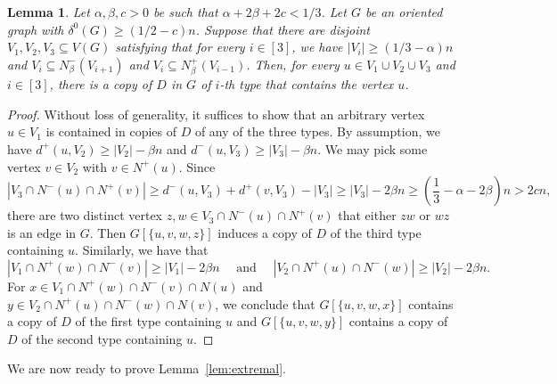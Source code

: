 \documentclass[11pt]{amsart}
\newtheorem{lemma}[theorem]{Lemma}
\begin{document}
\begin{lemma}\label{lem:ith}
    Let $\alpha, \beta, c>0$ be such that $\alpha+2\beta+2c < 1/3$. Let $G$ be an oriented graph with $\delta^0(G)\ge (1/2-c)n$. Suppose that there are disjoint $V_1,V_2,V_3\subseteq V(G)$ satisfying that for every $i\in [3]$, we have $|V_i|\ge (1/3-\alpha)n$ and $V_i\subseteq N^-_\beta(V_{i+1})$ and $V_i\subseteq N^+_\beta(V_{i-1})$. Then, for every $u\in V_1\cup V_2\cup V_3$ and $i \in [3]$, there is a copy of $D$ in $G$ of $i$-th type that contains the vertex $u$.
\end{lemma}

\begin{proof}
    Without loss of generality, it suffices to show that an arbitrary vertex $u\in V_1$ is contained in copies of $D$ of any of the three types.
    By assumption, we have $d^+(u,V_{2})\ge |V_{2}|-\beta n$ and $d^-(u,V_{3})\ge |V_{3}|-\beta n$.
    We may pick some vertex $v\in V_2$ with $v\in N^+(u)$.
    Since
    $$|V_3\cap N^-(u)\cap N^+(v)|\ge d^-(u, V_3)+d^+(v, V_3)-|V_3|\ge |V_3|-2\beta n \ge \left( \frac{1}{3}-\alpha - 2\beta \right) n >2cn,$$
    there are two distinct vertex $z,w\in V_3\cap N^-(u)\cap N^+(v)$ that either $zw$ or $wz$ is an edge in $G$.
    Then $G[\{u,v,w,z\}]$ induces a copy of $D$ of the third type containing $u$.
    Similarly, we have that
    $$|V_1\cap N^+(w)\cap N^-(v)|\ge |V_1|-2\beta n
    \quad \text{ and } \quad
    |V_2\cap N^+(u)\cap N^-(w)|\ge |V_2|-2\beta n.$$
    For $x\in V_1\cap N^+(w)\cap N^-(v)\cap N(u)$ and $y\in V_2\cap N^+(u)\cap N^-(w)\cap N(v)$,
    we conclude that $G[\{u,v,w,x\}]$ contains a copy of $D$ of the first type containing $u$ and $G[\{u,v,w,y\}]$ contains a copy of $D$ of the second type containing $u$.
\end{proof}

We are now ready to prove Lemma~\ref{lem:extremal}.
\end{document}
